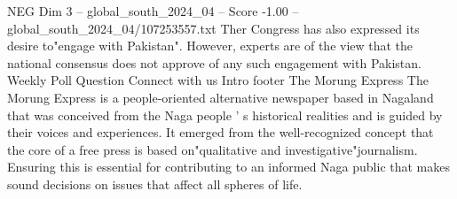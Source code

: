 \begin{textsample}{NEG Dim 3 – global\_south\_2024\_04 – Score -1.00 – global\_south\_2024\_04/107253557.txt}
Ther Congress has also expressed its desire to"engage with Pakistan".
However, experts are of the view that the national consensus does not approve of any such engagement with Pakistan.
Weekly Poll Question Connect with us Intro footer The Morung Express The Morung Express is a people-oriented alternative newspaper based in Nagaland that was conceived from the Naga people ' s historical realities and is guided by their voices and experiences.
It emerged from the well-recognized concept that the core of a free press is based on"qualitative and investigative"journalism.
Ensuring this is essential for contributing to an informed Naga public that makes sound decisions on issues that affect all spheres of life.

\end{textsample}
